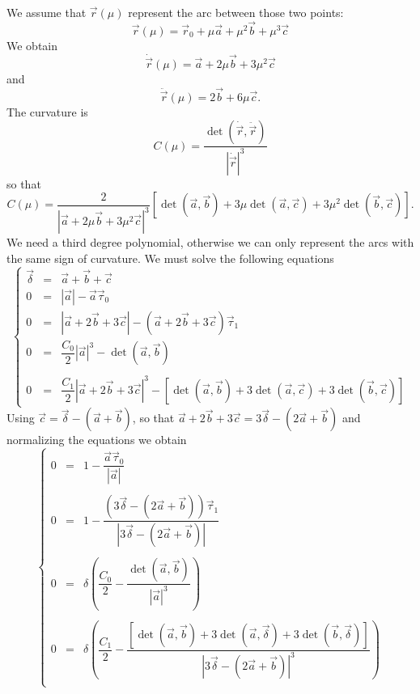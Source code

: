 \documentclass[11pt]{amsart}
\begin{document}
We assume that $\vec{r}(\mu)$ represent the arc between those two points:
\[
	\vec{r}(\mu) = \vec{r}_0 + \mu \vec{a} + \mu^2 \vec{b} + \mu^3 \vec{c}
\]
We obtain
\[
	\dot{\vec{r}}(\mu) = \vec{a} + 2 \mu \vec{b} + 3 \mu^2 \vec{c}
\]
and
\[
	\ddot{\vec{r}}(\mu) = 2\vec{b} + 6 \mu \vec{c}.
\]
The curvature is
\[
	C(\mu) = \dfrac{\det\left(\dot{\vec{r}},\ddot{\vec{r}}\right)}{\left|\dot{\vec{r}}\right|^3}
\]
so that
\[
	C(\mu) = \dfrac{2}{\left|\vec{a} + 2 \mu \vec{b} + 3 \mu^2 \vec{c}\right|^3}
	\left[
	\det\left(\vec{a},\vec{b}\right)
	+3\mu\det\left(\vec{a},\vec{c}\right)
	+3\mu^2\det\left(\vec{b},\vec{c}\right)
	\right].
\]
We need a third degree polynomial, otherwise we can only represent
the arcs with the same sign of curvature.
We must solve the following equations
\[
	\left\lbrace
	\begin{array}{rcl}
	\vec{\delta} & = & \vec{a} + \vec{b} + \vec{c}\\
	0 & = & \left|\vec{a}\right| - \vec{a}\vec{\tau}_0\\
	0 & = & \left|\vec{a}+2\vec{b}+3\vec{c}\right| - \left(\vec{a}+2\vec{b}+3\vec{c}\right)\vec{\tau}_1\\
	0 & = & \dfrac{C_0}{2} \left|\vec{a}\right|^3 - \det\left(\vec{a},\vec{b}\right)\\
	\\
	0 & = & \dfrac{C_1}{2} \left|\vec{a}+2\vec{b}+3\vec{c}\right|^3 
	- \left[\det\left(\vec{a},\vec{b}\right)+3\det\left(\vec{a},\vec{c}\right)+3\det\left(\vec{b},\vec{c}\right)\right]
	\end{array}
	\right.
\]
Using $\vec{c} = \vec{\delta} - \left(\vec{a}+\vec{b}\right)$, so that
$\vec{a}+2\vec{b}+3\vec{c}=3\vec{\delta}-(2\vec{a}+\vec{b})$
and normalizing the equations we obtain
\[
	\left\lbrace
	\begin{array}{rcl}
	0 & = &  1-\dfrac{\vec{a}\vec{\tau}_0}{\left|\vec{a}\right|}\\
	\\
	0 & = & 1 
	- \dfrac{\left( 3\vec{\delta}-(2\vec{a}+\vec{b})\right)\vec{\tau}_1}{\left|3\vec{\delta}-(2\vec{a}+\vec{b})\right|}
	\\
	\\
	0 & = & \delta\left( \dfrac{C_0}{2} -  \dfrac{\det\left(\vec{a},\vec{b}\right)}{\left|\vec{a}\right|^3 }\right)\\
	\\
	0 & = & \delta\left( \dfrac{C_1}{2}
	 - \dfrac{\left[
	 \det\left(\vec{a},\vec{b}\right) + 3\det\left(\vec{a},\vec{\delta}\right) + 3\det\left(\vec{b},\vec{\delta}\right)
	  \right]}{\left|3\vec{\delta}-(2\vec{a}+\vec{b})\right|^3}\right)\\
	\end{array}
	\right.
\]
\end{document}

